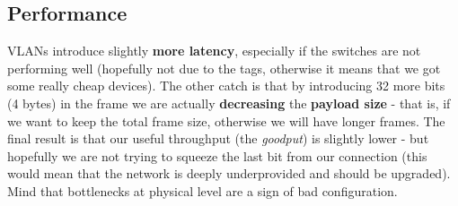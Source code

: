 \subsection{Performance}
VLANs introduce slightly \textbf{more latency}, especially if the switches are not performing well (hopefully not due to the tags, otherwise it means that we got some really cheap devices). The other catch is that by introducing 32 more bits (4 bytes) in the frame we are actually \textbf{decreasing} the \textbf{payload size} - that is, if we want to keep the total frame size, otherwise we will have longer frames. The final result is that our useful throughput (the \textit{goodput}) is slightly lower - but hopefully we are not trying to squeeze the last bit from our connection (this would mean that the network is deeply underprovided and should be upgraded). Mind that bottlenecks at physical level are a sign of bad configuration.